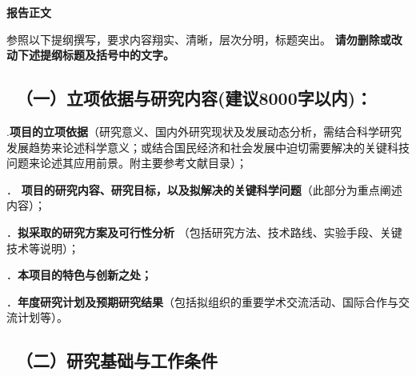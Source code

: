 \documentclass[12pt,UTF8,AutoFakeBold=3,a4paper]{ctexart} %
\newcommand{\sanhao}{\fontsize{16pt}{\baselineskip}\selectfont}
\newcommand{\sihao}{\fontsize{14pt}{\baselineskip}\selectfont}
\newcommand{\wuhao}{\fontsize{10.5pt}{\baselineskip}\selectfont}
\begin{document}

\begin{center}
{\sanhao \kaishu \bfseries 报告正文}
\end{center}

{\sihao \kaishu 参照以下提纲撰写，要求内容翔实、清晰，层次分明，标题突出。{\color{MsBlue} \bfseries 请勿删除或改动下述提纲标题及括号中的文字。}}
\vskip -5mm

{\color{MsBlue} \subsection{\sihao \templatefont \quad \ （一）立项依据与研究内容\textnormal{\templatefont (建议8000字以内)：}}} %


{\sihao \color{MsBlue} .{\bfseries 项目的立项依据}（研究意义、国内外研究现状及发展动态分析，需结合科学研究发展趋势来论述科学意义；或结合国民经济和社会发展中迫切需要解决的关键科技问题来论述其应用前景。附主要参考文献目录）；}

{}

\begin{spacing}{1} %
\wuhao


\end{spacing}
\newpage

{\sihao \color{MsBlue} ． {\bfseries 项目的研究内容、研究目标，以及拟解决的关键科学问题}（此部分为重点阐述内容）；}

{}


{\sihao \color{MsBlue} ．{\bfseries 拟采取的研究方案及可行性分析} （包括研究方法、技术路线、实验手段、关键技术等说明）；}

{}


{\sihao \color{MsBlue} ．{\bfseries 本项目的特色与创新之处；}}

{}


{\sihao \color{MsBlue} ．{\bfseries 年度研究计划及预期研究结果}（包括拟组织的重要学术交流活动、国际合作与交流计划等）。}

{}


\vskip -5mm %



{\color{MsBlue} \subsection{\sihao \templatefont \quad \ （二）研究基础与工作条件 }}
\end{document}
